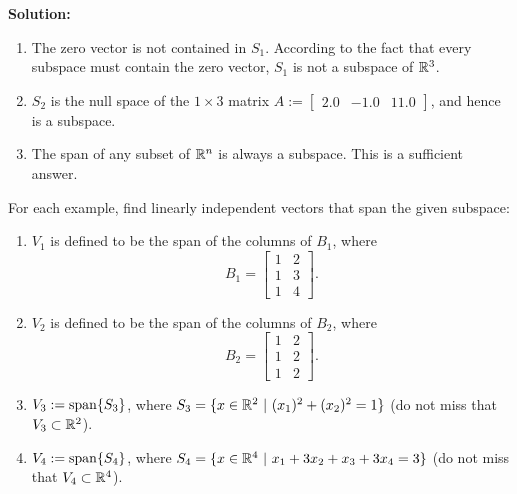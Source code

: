 \textbf{Solution:} 

\begin{enumerate}
\renewcommand{\labelenumi}{(\alph{enumi})}
\setlength{\itemsep}{.2cm}
\item The zero vector is not contained in $S_1$. According to the fact that every subspace must contain the zero vector, $S_1$ is not a subspace of $\mathbb R^3$.

\item $S_2$ is the null space of the $1 \times 3$ matrix $A:= \left[\begin{array}{ccc} 2.0 &  -1.0 & 11.0\end{array}\right]$, and hence is a subspace.


\item The span of any subset of $\mathbb R^n$ is always a subspace. This is a sufficient answer. 
\end{enumerate}
\Qed

\begin{example}
\label{ex:AnotherSpanExample}  For each example, find linearly independent vectors that span the given subspace:

\begin{enumerate}
\renewcommand{\labelenumi}{(\alph{enumi})}
\setlength{\itemsep}{.2cm}

\item $V_1$ is defined to be the span of the columns of $B_1$, where 
$$B_1=\left[\begin{array}{cc} 1 & 2\\
1 & 3 \\
1 & 4\end{array}\right]. $$ 

\item $V_2$ is defined to be the span of the columns of $B_2$, where 
$$B_2=\left[\begin{array}{cc} 1 & 2\\
1 & 2 \\
1 & 2\end{array}\right]. $$ 


\item $V_3:=\mathrm{span} \{ S_3 \}$, where $S_3=\{ x\in \mathbb R^2~|~ (x_1)^2 + (x_2)^2 = 1\}$ (do not miss that $V_3 \subset \mathbb R^2$). 

\item $V_4:= \mathrm{span} \{ S_4 \}$, where $S_4=\{ x\in \mathbb R^4~|~ x_1+ 3x_2 + x_3 + 3 x_4 = 3\}$ (do not miss that $V_4 \subset \mathbb R^4$). 


\end{enumerate}


\end{example}

